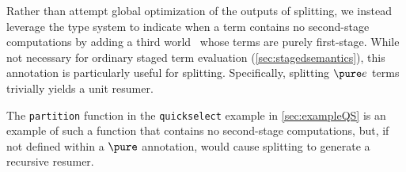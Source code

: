 \begin{abstrsyn}
Rather than attempt global optimization of the outputs of splitting,
we instead leverage the type system to indicate when a term contains
no second-stage computations by adding a third world \bbonep\ whose
terms are purely first-stage.  While not necessary for ordinary staged
term evaluation (\ref{sec:stagedsemantics}), this annotation is
particularly useful for splitting. Specifically, splitting $\pure e$
terms trivially yields a unit resumer.

The \texttt{partition} function in the \texttt{quickselect} example in
\ref{sec:exampleQS} is an example of such a function that contains no
second-stage computations, but, if not defined within a $\pure$
annotation, would cause splitting to generate a recursive resumer.

\end{abstrsyn}



